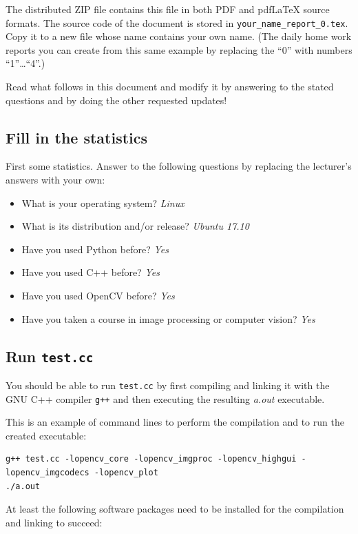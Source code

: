 \documentclass{article}
\begin{document}
The distributed ZIP file contains this file in both PDF and
pdf\LaTeX{} source formats.  The source code of the document is stored
in \texttt{your\_name\_report\_0.tex}.  Copy it to a new file whose
name contains your own name.  (The daily home work reports you can
create from this same example by replacing the ``0'' with numbers
``1''\ldots``4''.)

Read what follows in this document and modify it by answering to the
stated questions and by doing the other requested updates!


\subsection{Fill in the statistics}

First some statistics.  Answer to the following questions by replacing
the lecturer's answers with your own:

\begin{itemize}
\item What is your operating system? \emph{Linux}
\item What is its distribution and/or release? \emph{Ubuntu 17.10}
\item Have you used Python before? \emph{Yes}
\item Have you used C++ before? \emph{Yes}
\item Have you used OpenCV before? \emph{Yes}
\item Have you taken a course in image processing or computer vision? \emph{Yes}
\end{itemize}


\subsection{Run \texttt{test.cc}}

You should be able to run \texttt{test.cc} by first compiling and
linking it with the GNU C++ compiler \texttt{g++} and then executing
the resulting \emph{a.out} executable.

This is an example of command lines to perform the compilation and to
run the created executable:

{\small
\begin{verbatim}
g++ test.cc -lopencv_core -lopencv_imgproc -lopencv_highgui -lopencv_imgcodecs -lopencv_plot
./a.out
\end{verbatim}
}

At least the following software packages need to be installed for the
compilation and linking to succeed:
\end{document}
